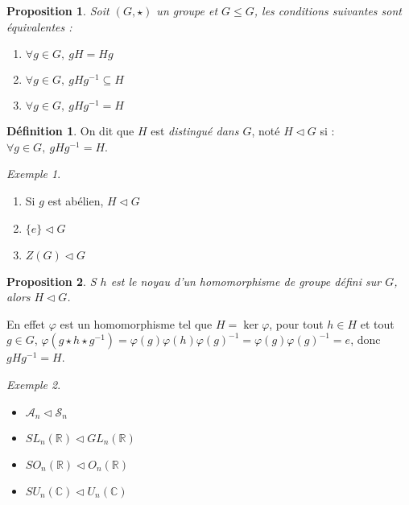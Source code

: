 \documentclass[]{article}
\newtheorem{myproposition}{Proposition}
\theoremstyle{remark}
\newtheorem{myexmpl}{Exemple}
\theoremstyle{definition}
\newtheorem{mydef}{Définition}
\begin{document}
\begin{myproposition}
	Soit $(G, \star)$ un groupe et $G \leqslant G$, les conditions suivantes sont équivalentes :
	\begin{enumerate}
		\item $\forall g \in G, ~ g H = H g$
		\item $\forall g \in G, ~ g H g^{-1} \subseteq H$
		\item $\forall g \in G, ~ g H g^{-1} = H$
	\end{enumerate}
\end{myproposition}

\begin{mydef}
	On dit que $H$ est \textit{distingué dans $G$}, noté  $H \vartriangleleft G$ si :$\forall g \in G, ~ g H g^{-1} = H$.
\end{mydef}

\begin{myexmpl}
	\leavevmode
	\begin{enumerate}
		\item Si $g$ est abélien, $H \vartriangleleft G$
		\item $\{e\} \vartriangleleft G$
		\item $Z(G) \vartriangleleft G$
	\end{enumerate}
\end{myexmpl}

\begin{myproposition}
	S $h$ est le noyau d'un homomorphisme de groupe défini sur $G$, alors $H \vartriangleleft G$.
\end{myproposition}

En effet $\varphi$ est un homomorphisme tel que $H= \ker \varphi$, pour tout $h \in H$ et tout $g \in G$, $\varphi(g \star h \star g^{-1}) = \varphi(g)\varphi(h)\varphi(g)^{-1}=\varphi(g)\varphi(g)^{-1}=e$, donc $g H g^{-1} = H$.

\begin{myexmpl}
	\leavevmode
	\begin{itemize}
		\item $\mathcal{A}_n \vartriangleleft \mathscr{S}_n$
		\item $SL_n(\mathbb{R}) \vartriangleleft GL_n(\mathbb{R})$
		\item $SO_n(\mathbb{R}) \vartriangleleft O_n(\mathbb{R})$
		\item $SU_n(\mathbb{C}) \vartriangleleft U_n(\mathbb{C})$
	\end{itemize}
\end{myexmpl}
\end{document}
